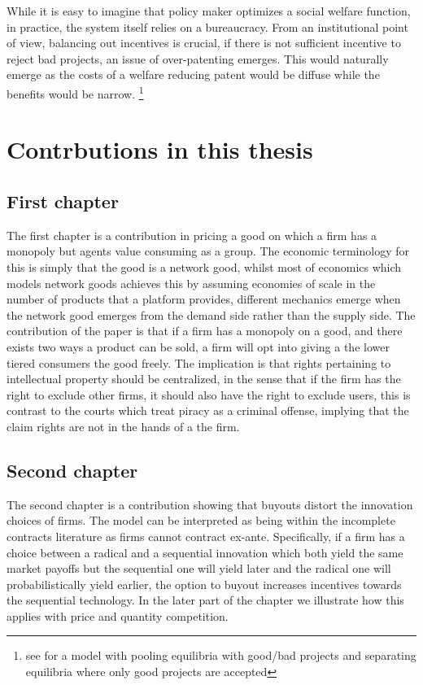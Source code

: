 \documentclass[12pt]{article}
\numberwithin{equation}{section}
\begin{document}
While it is easy to imagine that policy maker optimizes a social welfare function, in practice, the system itself relies on a bureaucracy. From an institutional point of view, balancing out incentives is crucial, if there is not sufficient incentive to reject bad projects, an issue of over-patenting emerges. This would naturally emerge as the costs of a welfare reducing patent would be diffuse while the benefits would be narrow. \footnote{see \cite{Caillaud2012} for a model with pooling equilibria with good/bad projects and separating equilibria where only good projects are accepted}




\section{Contrbutions in this thesis}

\subsection{First chapter}

The first chapter is a contribution in pricing a good on which a firm has a monopoly but agents value consuming as a group. The economic terminology for this is simply that the good is a network good, whilst most of economics which models network goods achieves this by assuming economies of scale in the number of products that a platform provides, different mechanics emerge when the network good emerges from the demand side rather than the supply side. The contribution of the paper is that if a firm has a monopoly on a good, and there exists two ways a product can be sold, a firm will opt into giving a the lower tiered consumers the good freely. The implication is that rights pertaining to intellectual property should be centralized, in the sense that if the firm has the right to exclude other firms, it should also have the right to exclude users, this is contrast to the courts which treat piracy as a criminal offense, implying that the claim rights are not in the hands of a the firm.


\subsection{Second chapter}

The second chapter is a contribution showing that buyouts distort the innovation choices of firms. The model can be interpreted as being within the incomplete contracts literature as firms cannot contract ex-ante. Specifically, if a firm has a choice between a radical and a sequential innovation which both yield the same market payoffs but the sequential one will yield later and the radical one will probabilistically yield earlier, the option to buyout increases incentives towards the sequential technology. In the later part of the chapter we illustrate how this applies with price and quantity competition.
\end{document}
